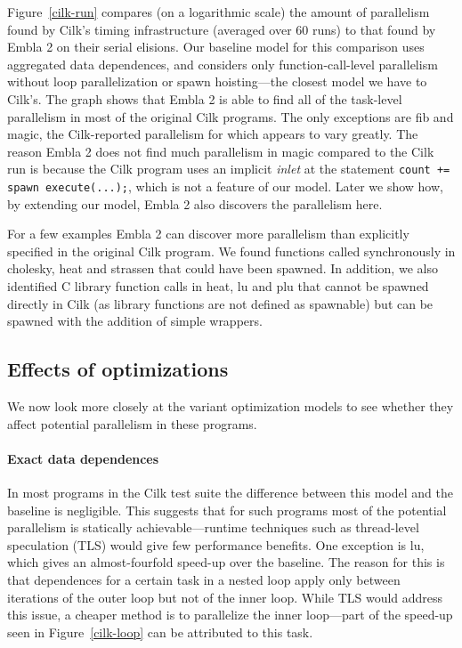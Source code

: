 Figure~\ref{cilk-run} compares (on a logarithmic scale) the amount of parallelism found by Cilk's timing infrastructure (averaged over 60 runs) to that found by Embla 2 on their serial elisions.
Our baseline model for this comparison uses aggregated data dependences, and considers only function-call-level parallelism without loop parallelization or spawn hoisting---the closest model we have to Cilk's.
The graph shows that Embla 2 is able to find all of the task-level parallelism in most of the original Cilk programs.
The only exceptions are \textsf{fib} and \textsf{magic}, the Cilk-reported parallelism for which appears to vary greatly.
The reason Embla 2 does not find much parallelism in \textsf{magic} compared to the Cilk run is because the Cilk program uses an implicit \emph{inlet} at the statement \texttt{count += spawn execute(...);},
which is not a feature of our model.
Later we show how, by extending our model, Embla 2 also discovers the parallelism here.

For a few examples Embla 2 can discover more parallelism than explicitly specified in the original Cilk program.
We found functions called synchronously in \textsf{cholesky}, \textsf{heat} and \textsf{strassen} that could have been spawned.
In addition, we also identified C library function calls in \textsf{heat},
\textsf{lu} and \textsf{plu} that cannot be spawned directly in Cilk (as library functions are not defined as spawnable) but can be spawned with the addition of simple wrappers.

\subsection{Effects of optimizations} \label{sresults:cilk-opts}

We now look more closely at the variant optimization models to see whether they affect potential parallelism in these programs.

\paragraph{Exact data dependences}
In most programs in the Cilk test suite the difference between this model and the baseline is negligible.
This suggests that for such programs most of the potential parallelism is statically achievable---runtime techniques such as thread-level speculation (TLS) would give few performance benefits.
One exception is \textsf{lu}, which gives an almost-fourfold speed-up over the baseline.
The reason for this is that dependences for a certain task in a nested loop apply only between iterations of the outer loop but not of the inner loop.
While TLS would address this issue, a cheaper method is to parallelize the inner loop---part of the speed-up seen in Figure~\ref{cilk-loop} can be attributed to this task.

